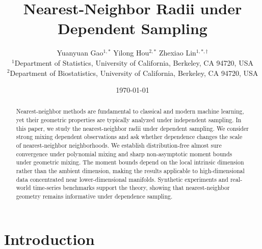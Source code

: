 \documentclass[12pt]{article}
\theoremstyle{definition}
\begin{document}
\setlength{\abovedisplayskip}{5pt}
\setlength{\belowdisplayskip}{5pt}
\setlength{\abovedisplayshortskip}{5pt}
\setlength{\belowdisplayshortskip}{5pt}
\hypersetup{colorlinks,breaklinks,urlcolor=blue,linkcolor=blue}



\title{\LARGE Nearest-Neighbor Radii under Dependent Sampling}

\renewcommand{\thefootnote}{\fnsymbol{footnote}}

\author{
Yuanyuan Gao$^{1,\ast}$ \quad
Yilong Hou$^{2,\ast}$ \quad
Zhexiao Lin$^{1,\ast,\dagger}$ \\[0.4em]
\small $^1$Department of Statistics, University of California, Berkeley, CA 94720, USA \\
\small $^2$Department of Biostatistics, University of California, Berkeley, CA 94720, USA
}

\date{\today}

\maketitle


\vspace{-1em}

\begin{abstract}
Nearest-neighbor methods are fundamental to classical and modern machine learning, yet their geometric properties are typically analyzed under independent sampling. In this paper, we study the nearest-neighbor radii under dependent sampling. We consider strong mixing dependent observations and ask whether dependence changes the scale of nearest-neighbor neighborhoods. We establish distribution-free almost sure convergence under polynomial mixing and sharp non-asymptotic moment bounds under geometric mixing. The moment bounds depend on the local intrinsic dimension rather than the ambient dimension, making the results applicable to high-dimensional data concentrated near lower-dimensional manifolds. Synthetic experiments and real-world time-series benchmarks support the theory, showing that nearest-neighbor geometry remains informative under dependence sampling.
\end{abstract}

\section{Introduction}\label{sec:intro}
\end{document}
